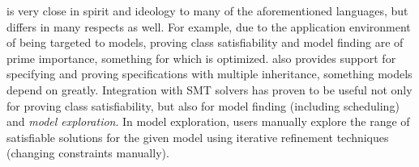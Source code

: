 \Klang{} is very close in spirit and ideology to many of the
aforementioned languages, but differs in many respects as well. For
example, due to the application environment of \Klang{} being targeted
to \sysml{} models, proving class satisfiability and model finding are
of prime importance, something for which \Klang{} is optimized. \Klang{}
also provides support for specifying and proving specifications with
multiple inheritance, something \sysml{} models depend on
greatly. Integration with SMT solvers has proven to be useful not only
for proving class satisfiability, but also for model finding
(including scheduling) and {\em model exploration}. In model
exploration, users manually explore the range of satisfiable solutions
for the given model using iterative refinement techniques (changing
constraints manually).
